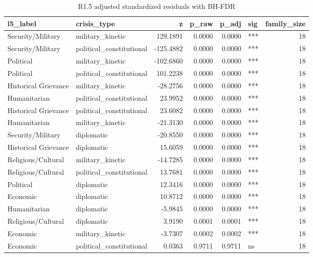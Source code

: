 \begin{table}
\caption{R1.5 adjusted standardized residuals with BH-FDR}
\label{tab:r1r2_frame_crisistype_residuals}
\begin{tabular}{llrrrlr}
\toprule
l5\_label & crisis\_type & z & p\_raw & p\_adj & sig & family\_size \\
\midrule
Security/Military & military\_kinetic & 129.1891 & 0.0000 & 0.0000 & *** & 18 \\
Security/Military & political\_constitutional & -125.4882 & 0.0000 & 0.0000 & *** & 18 \\
Political & military\_kinetic & -102.6860 & 0.0000 & 0.0000 & *** & 18 \\
Political & political\_constitutional & 101.2238 & 0.0000 & 0.0000 & *** & 18 \\
Historical Grievance & military\_kinetic & -28.2756 & 0.0000 & 0.0000 & *** & 18 \\
Humanitarian & political\_constitutional & 23.9952 & 0.0000 & 0.0000 & *** & 18 \\
Historical Grievance & political\_constitutional & 23.6082 & 0.0000 & 0.0000 & *** & 18 \\
Humanitarian & military\_kinetic & -21.3130 & 0.0000 & 0.0000 & *** & 18 \\
Security/Military & diplomatic & -20.8550 & 0.0000 & 0.0000 & *** & 18 \\
Historical Grievance & diplomatic & 15.6059 & 0.0000 & 0.0000 & *** & 18 \\
Religious/Cultural & military\_kinetic & -14.7285 & 0.0000 & 0.0000 & *** & 18 \\
Religious/Cultural & political\_constitutional & 13.7681 & 0.0000 & 0.0000 & *** & 18 \\
Political & diplomatic & 12.3416 & 0.0000 & 0.0000 & *** & 18 \\
Economic & diplomatic & 10.8712 & 0.0000 & 0.0000 & *** & 18 \\
Humanitarian & diplomatic & -5.9845 & 0.0000 & 0.0000 & *** & 18 \\
Religious/Cultural & diplomatic & 3.9190 & 0.0001 & 0.0001 & *** & 18 \\
Economic & military\_kinetic & -3.7307 & 0.0002 & 0.0002 & *** & 18 \\
Economic & political\_constitutional & 0.0363 & 0.9711 & 0.9711 & ns & 18 \\
\bottomrule
\end{tabular}
\end{table}
